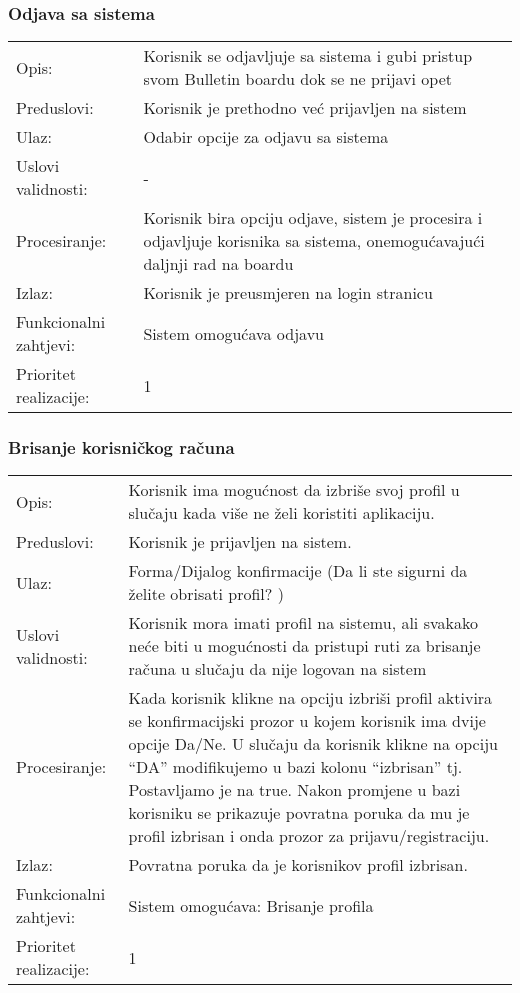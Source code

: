 \subsubsection{Odjava sa sistema}

\begin{tabu} to 1.2
 Opis: & Korisnik se odjavljuje sa sistema i gubi pristup svom Bulletin boardu dok se ne prijavi opet \\
Preduslovi: & Korisnik je prethodno već prijavljen na sistem \\
Ulaz: & Odabir opcije za odjavu sa sistema \\
Uslovi validnosti: & - \\
Procesiranje: & Korisnik bira opciju odjave, sistem je procesira i odjavljuje korisnika sa sistema, onemogućavajući daljnji rad na boardu \\
Izlaz:& Korisnik je preusmjeren na login stranicu \\
Funkcionalni zahtjevi: & Sistem omogućava odjavu \\
Prioritet realizacije: & 1

\end{tabu}
\newpage


\subsubsection{Brisanje korisničkog računa}

\begin{tabu} to 1.2
Opis: & Korisnik ima mogućnost da izbriše svoj profil u slučaju kada više ne želi koristiti aplikaciju. \\
Preduslovi: & Korisnik je prijavljen na sistem. \\
Ulaz: & Forma/Dijalog konfirmacije (Da li ste sigurni da želite obrisati profil? ) \\
Uslovi validnosti: & Korisnik mora imati profil na sistemu, ali svakako neće biti u mogućnosti da pristupi ruti za brisanje računa u slučaju da nije logovan na sistem \\
Procesiranje: & Kada korisnik klikne na opciju izbriši profil aktivira se konfirmacijski prozor u kojem korisnik ima dvije opcije Da/Ne. U slučaju da korisnik klikne na opciju “DA” modifikujemo u bazi kolonu “izbrisan” tj. Postavljamo je na true. Nakon promjene u bazi korisniku se prikazuje povratna poruka da mu je profil izbrisan i onda  prozor za prijavu/registraciju. \\
Izlaz: & Povratna poruka da je korisnikov profil izbrisan. \\
Funkcionalni zahtjevi: & Sistem omogućava: Brisanje profila \\
Prioritet realizacije: & 1

\end{tabu}
\newpage
